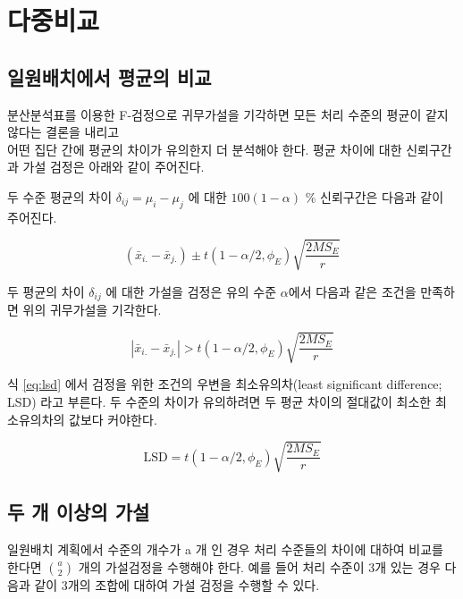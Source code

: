 \documentclass[
]{book}
\theoremstyle{definition}
\theoremstyle{definition}
\theoremstyle{definition}
\theoremstyle{definition}
\theoremstyle{remark}
\begin{document}
\hypertarget{uxb2e4uxc911uxbe44uxad50}{%
\section{다중비교}\label{uxb2e4uxc911uxbe44uxad50}}

\hypertarget{uxc77cuxc6d0uxbc30uxce58uxc5d0uxc11c-uxd3c9uxade0uxc758-uxbe44uxad50}{%
\subsection{일원배치에서 평균의 비교}\label{uxc77cuxc6d0uxbc30uxce58uxc5d0uxc11c-uxd3c9uxade0uxc758-uxbe44uxad50}}

분산분석표를 이용한 F-검정으로 귀무가설을 기각하면 모든 처리 수준의
평균이 같지 않다는 결론을 내리고\\
어떤 집단 간에 평균의 차이가 유의한지 더 분석해야 한다. 평균 차이에 대한
신뢰구간과 가설 검정은 아래와 같이 주어진다.

두 수준 평균의 차이 \(\delta_{ij} = \mu_i - \mu_j\) 에 대한
\(100(1-\alpha)\) \% 신뢰구간은 다음과 같이 주어진다.

\begin{equation}
( \bar {x}_{i.} - \bar {x}_{j.})   \pm t(1-\alpha/2, \phi_E) \sqrt{ \frac{2MS_E}{r}} 
\label{eq:twomeanci}
\end{equation}

두 평균의 차이 \(\delta_{ij}\) 에 대한 가설을 검정은 유의 수준
\(\alpha\)에서 다음과 같은 조건을 만족하면 위의 귀무가설을 기각한다.

\begin{equation}
 \left | \bar {x}_{i.} - \bar {x}_{j.} \right | > t(1-\alpha/2, \phi_E) \sqrt{ \frac{2MS_E}{r}} 
\label{eq:lsd}
\end{equation}

식 \eqref{eq:lsd} 에서 검정을 위한 조건의 우변을 최소유의차(least
significant difference; LSD) 라고 부른다. 두 수준의 차이가 유의하려면 두
평균 차이의 절대값이 최소한 최소유의차의 값보다 커야한다.

\[  \text{LSD} =t(1-\alpha/2, \phi_E) \sqrt{ \frac{2MS_E}{r}}  \]

\hypertarget{uxb450-uxac1c-uxc774uxc0c1uxc758-uxac00uxc124}{%
\subsection{두 개 이상의 가설}\label{uxb450-uxac1c-uxc774uxc0c1uxc758-uxac00uxc124}}

일원배치 계획에서 수준의 개수가 a 개 인 경우 처리 수준들의 차이에 대하여
비교를 한다면 \(a \choose 2\) 개의 가설검정을 수행해야 한다. 예를 들어
처리 수준이 3개 있는 경우 다음과 같이 3개의 조합에 대하여 가설 검정을
수행할 수 있다.
\end{document}
